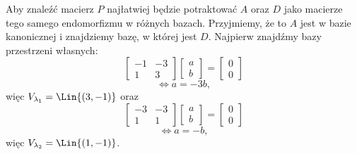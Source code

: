 \begin{solution}
    Aby znaleźć macierz $P$ najłatwiej będzie potraktować $A$ oraz $D$ jako macierze tego samego endomorfizmu w różnych bazach. Przyjmiemy, że to $A$ jest w bazie kanonicznej i znajdziemy bazę, w której jest $D$. Najpierw znajdźmy bazy przestrzeni własnych:
    \[ \begin{bmatrix}
        -1 & -3 \\
        1 & 3
    \end{bmatrix}\begin{bmatrix}
        a \\ b
    \end{bmatrix} = \begin{bmatrix}
        0 \\ 0
    \end{bmatrix} \]
    \[ \iff a = -3b, \]
    więc $V_{\lambda_1} = \Lin\{(3, -1)\}$ oraz
    \[ \begin{bmatrix}
        -3 & -3 \\
        1 & 1
    \end{bmatrix}\begin{bmatrix}
        a \\ b
    \end{bmatrix} = \begin{bmatrix}
        0 \\ 0
    \end{bmatrix} \]
    \[ \iff a = -b, \]
    więc $V_{\lambda_2} = \Lin\{(1, -1)\}$.


\end{solution}
